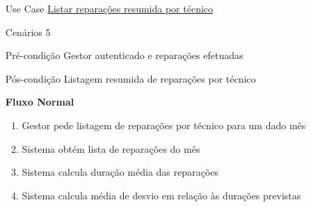 \documentclass[../relatorio.tex]{subfiles}
\begin{document}
\begin{itemize}
    \item[Use Case] {\underline{Listar reparações resumida por técnico}}
    \item[Cenários] {5}
    \item[Pré-condição] {Gestor autenticado e reparações efetuadas}
    \item[Pós-condição] {Listagem resumida de reparações por técnico}
          \begin{flushleft}
              \textbf{Fluxo Normal}
          \end{flushleft}
          \begin{enumerate}
              \item Gestor pede listagem de reparações por técnico para um dado mês
              \item Sistema obtém lista de reparações do mês
              \item Sistema calcula duração média das reparações
              \item Sistema calcula média de desvio em relação às durações previstas
          \end{enumerate}
\end{itemize}
\end{document}

